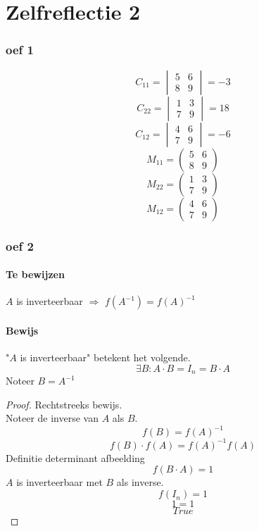\documentclass[lineaire_algebra_oplossingen.tex]{subfiles}
\begin{document}
\part{Zelfreflectie 2}
\section{oef 1}
\[
C_{11} = 
\begin{vmatrix}
5 & 6 \\
8 & 9
\end{vmatrix}
=-3
\]
\[
C_{22}= 
\begin{vmatrix}
1 & 3 \\
7 & 9
\end{vmatrix}
=
18
\]
\[
C_{12} =
\begin{vmatrix}
4 & 6 \\
7 & 9
\end{vmatrix}
=-6
\]
\[
M_{11} = 
\begin{pmatrix}
5 & 6 \\
8 & 9
\end{pmatrix}
\]
\[
M_{22}= 
\begin{pmatrix}
1 & 3 \\
7 & 9
\end{pmatrix}
\]
\[
M_{12} =
\begin{pmatrix}
4 & 6 \\
7 & 9
\end{pmatrix}
\]
\section{oef 2}
\subsection*{Te bewijzen}
$A$ is inverteerbaar $\Rightarrow$ $f(A^{-1}) = f(A)^{-1}$
\subsection*{Bewijs}
"$A$ is inverteerbaar" betekent het volgende.
\[
\exists B: A\cdot B = I_n = B\cdot A
\]
Noteer $B = A^{-1}$ 
\begin{proof}
Rechtstreeks bewijs.\\
Noteer de inverse van $A$ als $B$.
\[
f(B) = f(A)^{-1}
\]
\[
f(B)\cdot f(A) = f(A)^{-1}f(A)
\]
Definitie determinant afbeelding
\[
f(B\cdot A) = 1
\]
$A$ is inverteerbaar met $B$ als inverse.
\[
f(I_n) = 1
\]
\[
1 = 1
\]
\[
True
\]
\end{proof}
\end{document}

